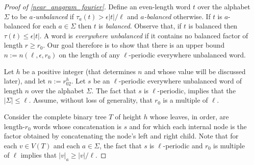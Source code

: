 \documentclass{patmorin}
\begin{document}
\begin{proof}[Proof of \cref{near_anagram_fourier}]
    Define an even-length word $t$ over the alphabet $\Sigma$ to be \emph{$a$-unbalanced} if $\tau_a(t)>\epsilon|t|/\ell$ and \emph{$a$-balanced} otherwise.  If $t$ is $a$-balanced for each $a\in\Sigma$ then $t$ is \emph{balanced}. Observe that, if $t$ is balanced then $\tau(t)\le \epsilon|t|$. A word is \emph{everywhere unbalanced} if it contains no balanced factor of length $r\ge r_0$. Our goal therefore is to show that there is an upper bound $n:=n(\ell,\epsilon,r_0)$ on the length of any $\ell$-periodic everywhere unbalanced word.

    Let $h$ be a positive integer (that determines $n$ and whose value will be discussed later), and let $n:=r_02^{h}$. Let $s$ be an $\ell$-periodic everywhere unbalanced word of length $n$ over the alphabet $\Sigma$.  The fact that $s$ is $\ell$-periodic, implies that the $|\Sigma|\le\ell$.  Assume, without loss of generality, that $r_0$ is a multiple of $\ell$.

    Consider the complete binary tree $T$ of height $h$ whose leaves, in order, are length-$r_0$ words whose concatenation is $s$ and for which each internal node is the factor obtained by concatenating the node's left and right child.
    Note that for each $v\in V(T)$ and each $a\in\Sigma$, the fact that $s$ is $\ell$-periodic and $r_0$ is multiple of $\ell$ implies that $|v|_{a}\ge |v|/\ell$.





\end{proof}
\end{document}

